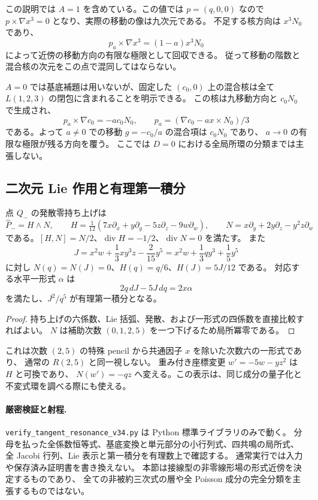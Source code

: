 この説明では $A=1$ を含めている。この値では $p=(q,0,0)$ なので
$p\times\nabla x^3=0$ となり、実際の移動の像は九次元である。
不足する核方向は $x^3N_0$ であり、
\[
 p_a\times\nabla x^3=(1-a)x^3N_0
\]
によって近傍の移動方向の有限な極限として回収できる。
従って移動の階数と混合核の次元をこの点で混同してはならない。

$A=0$ では基底補題は用いないが、固定した $(c_0,0)$ 上の混合核は全て
$L(1,2,3)$ の閉包に含まれることを明示できる。
この核は九移動方向と $c_0N_0$ で生成され、
\[
 p_a\times\nabla c_0=-a c_0N_0,\qquad
 p_a=(\nabla c_0-a x\times N_0)/3
\]
である。よって $a\ne0$ での移動 $g=-c_0/a$ の混合項は $c_0N_0$ であり、
$a\to0$ の有限な極限が残る方向を覆う。
ここでは $D=0$ における全局所環の分類までは主張しない。

\subsection{二次元 Lie 作用と有理第一積分}

\begin{proposition}
点 $Q_-$ の発散零持ち上げは
\[
 \widehat P_-=H\wedge N,\qquad
 H=\tfrac1{12}(7x\partial_x+y\partial_y-5z\partial_z-9w\partial_w),
 \qquad N=x\partial_y+2y\partial_z-y^2z\partial_w
\]
である。$[H,N]=N/2$、$\operatorname{div}H=-1/2$、$\operatorname{div}N=0$ を満たす。
また
\[
 J=x^2w+\frac13xy^3z-\frac2{15}y^5
   =x^2w+\frac13q y^3+\frac15y^5
\]
に対し $N(q)=N(J)=0$、$H(q)=q/6$、$H(J)=5J/12$ である。
対応する水平一形式 $\alpha$ は
\[
 2q\,dJ-5J\,dq=2x\alpha
\]
を満たし、$J^2/q^5$ が有理第一積分となる。
\end{proposition}

\begin{proof}
持ち上げの六係数、Lie 括弧、発散、および一形式の四係数を直接比較すればよい。
$N$ は補助次数 $(0,1,2,5)$ を一つ下げるため局所冪零である。
\end{proof}

これは次数 $(2,5)$ の特殊 pencil から共通因子 $x$ を除いた次数六の一形式であり、
通常の $R(2,5)$ と同一視しない。
重み付き座標変更 $w'=-5w-yz^2$ は $H$ と可換であり、
$N(w')=-qz$ へ変える。この表示は、同じ成分の量子化と不変式環を調べる際にも使える。

\paragraph{厳密検証と射程.}
\texttt{verify\_tangent\_resonance\_v34.py} は Python 標準ライブラリのみで動く。
分母を払った全係数恒等式、基底変換と単元部分の小行列式、四共鳴の局所式、
全 Jacobi 行列、Lie 表示と第一積分を有理数上で確認する。
通常実行では入力や保存済み証明書を書き換えない。
本節は接線型の非零線形場の形式近傍を決定するものであり、
全ての非被約三次式の層や全 Poisson 成分の完全分類を主張するものではない。

